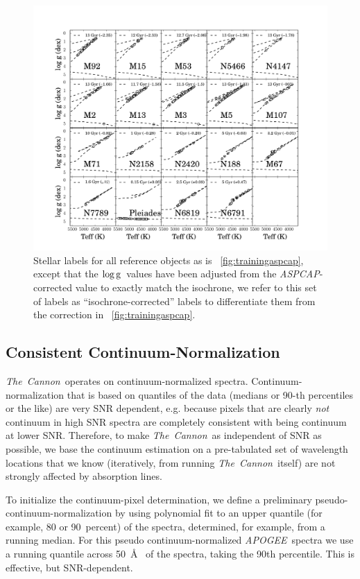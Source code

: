 \documentclass[12pt, preprint]{aastex}
\newcommand{\tc}{\textsl{The~Cannon}}
\newcommand{\apogee}{\textsl{APOGEE}}
\newcommand{\aspcap}{\textsl{ASPCAP}}
\newcommand{\logg}{\mbox{$\rm \log g$}}
\begin{document}
\begin{figure}[h!]
\centering
  \includegraphics[scale=0.31]{./plots/training_mkn2.pdf}
\caption{Stellar labels for all reference objects as is \figurename~\ref{fig:trainingaspcap}, except that the \logg\ values have been adjusted from the \aspcap-corrected value to exactly match the isochrone, we refer to this set of labels as  ``isochrone-corrected'' labels to differentiate them from the correction in \figurename~\ref{fig:trainingaspcap}.  }
\label{fig:trainingisochrone}
\end{figure}

\subsection{Consistent Continuum-Normalization}\label{sec:ContNorm}

\tc\ operates on continuum-normalized spectra.
Continuum-normalization that is based on quantiles of the data (medians or 90-th percentiles or the like)
are very SNR dependent, e.g. because pixels that are clearly \emph{not} continuum in high SNR
spectra are completely consistent with being continuum at lower SNR.
Therefore, to make \tc\ as independent of SNR as possible,
we base the continuum estimation on a pre-tabulated set of wavelength locations that we know
(iteratively, from running \tc\ itself) are not strongly affected by absorption lines.

To initialize the continuum-pixel determination,
we define a preliminary pseudo-continuum-normalization by 
using polynomial fit to an upper quantile (for example, 80 or 90~percent) of the spectra, determined, for example, from a running median. For this pseudo continuum-normalized \apogee\ spectra we use a running quantile across 50~\AA~ of the spectra, taking the 90th percentile. This is effective, but SNR-dependent.
  
\end{document}
